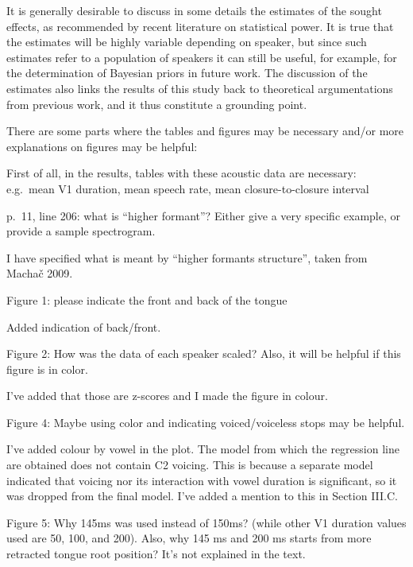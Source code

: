 \documentclass[]{article}
\begin{document}
\color{plum}

It is generally desirable to discuss in some details the estimates of
the sought effects, as recommended by recent literature on statistical
power. It is true that the estimates will be highly variable depending
on speaker, but since such estimates refer to a population of speakers
it can still be useful, for example, for the determination of Bayesian
priors in future work. The discussion of the estimates also links the
results of this study back to theoretical argumentations from previous
work, and it thus constitute a grounding point. \color{black}

There are some parts where the tables and figures may be necessary
and/or more explanations on figures may be helpful:

First of all, in the results, tables with these acoustic data are
necessary: e.g.~mean V1 duration, mean speech rate, mean
closure-to-closure interval

p.~11, line 206: what is ``higher formant''? Either give a very specific
example, or provide a sample spectrogram.

\color{plum}

I have specified what is meant by ``higher formants structure'', taken
from Machač 2009. \color{black}

Figure 1: please indicate the front and back of the tongue

\color{plum}

Added indication of back/front. \color{black}

Figure 2: How was the data of each speaker scaled? Also, it will be
helpful if this figure is in color.

\color{plum}

I've added that those are z-scores and I made the figure in colour.
\color{black}

Figure 4: Maybe using color and indicating voiced/voiceless stops may be
helpful.

\color{plum}

I've added colour by vowel in the plot. The model from which the
regression line are obtained does not contain C2 voicing. This is
because a separate model indicated that voicing nor its interaction with
vowel duration is significant, so it was dropped from the final model.
I've added a mention to this in Section III.C. \color{black}

Figure 5: Why 145ms was used instead of 150ms? (while other V1 duration
values used are 50, 100, and 200). Also, why 145 ms and 200 ms starts
from more retracted tongue root position? It's not explained in the
text.
\end{document}

